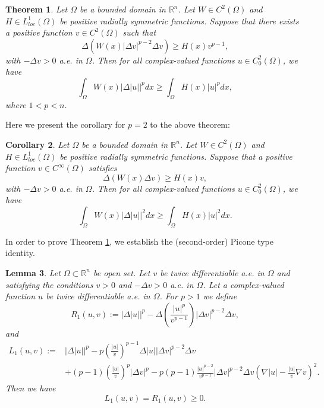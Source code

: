\documentclass[a4paper,12pt,reqno]{amsart}
\theoremstyle{theorem}
\numberwithin{equation}{section}
\theoremstyle{plain}
\newtheorem{thm}{Theorem}[section]
\newtheorem{cor}[thm]{Corollary}
\newtheorem{lem}[thm]{Lemma}
\theoremstyle{definition}
\theoremstyle{defi}
\begin{document}
\begin{thm}\label{thm_Rellich}
	Let $\Omega$ be a bounded domain in $\mathbb{R}^n$. Let $W \in C^{2}(\Omega)$ and $H \in L^1_{loc}(\Omega)$ be positive radially symmetric functions. Suppose that there exists a positive function $v\in C^{2}(\Omega)$ such that
	\begin{equation}\label{R-hyp_lp}
	\Delta (W(x) |\Delta v|^{p-2}\Delta v) \geq H(x) v^{p-1},
	\end{equation}
	with $-\Delta v >0$ a.e. in $\Omega$. Then for all complex-valued functions $ u \in C^{2}_0(\Omega)$, we have 
	\begin{equation}
	\int_{\Omega} W(x) |\Delta |u||^p dx \geq \int_{\Omega} H(x) |u|^p dx,
	\end{equation}
	where $1<p<n$.
\end{thm}
Here we present the corollary for $p=2$ to the above theorem:
\begin{cor}\label{cor_Rellich}
	Let $\Omega$ be a bounded domain in $\mathbb{R}^n$. Let $W \in C^{2}(\Omega)$ and $H \in L^1_{loc}(\Omega)$ be positive radially symmetric functions. Suppose that a positive function $v\in C^{\infty}(\Omega)$ satisfies
	\begin{equation}\label{R-hyp_l2}
	\Delta (W(x)\Delta v) \geq H(x) v,
	\end{equation}
	with $-\Delta v >0$ a.e. in $\Omega$. Then for all complex-valued functions $ u \in C^{2}_0(\Omega)$, we have 
	\begin{equation}\label{R_eq_l2}
	\int_{\Omega} W(x) |\Delta |u||^2 dx \geq \int_{\Omega} H(x) |u|^2 dx.
	\end{equation}
\end{cor}
In order to prove Theorem \ref{thm_Rellich}, we establish the (second-order) Picone type identity. 
\begin{lem}\label{lem_Piceone-R}
	Let $\Omega \subset \mathbb{R}^n$ be open set. Let $v$ be twice differentiable a.e. in $\Omega$ and satisfying the conditions $v >0$ and $-\Delta v >0$ a.e. in $\Omega$. Let a complex-valued function $u$ be twice differentiable a.e. in $\Omega$. For $p>1$ we define
	\begin{equation}
	R_1(u,v):= |\Delta |u||^p - \Delta\left( \frac{|u|^p}{v^{p-1}} \right) |\Delta v|^{p-2} \Delta v, 
	\end{equation}
	and 
	\begin{align}
	L_1(u,v):= &|\Delta |u||^p - p \left(\frac{|u|}{v}\right)^{p-1} \Delta |u| |\Delta v|^{p-2} \Delta v \\
	& + (p-1)\left( \frac{|u|}{v}\right)^p |\Delta v|^p  - p(p-1)\frac{|u|^{p-2}}{v^{p-1}} |\Delta v|^{p-2} \Delta v \left( \nabla |u| - \frac{|u|}{v} \nabla v\right)^2. \nonumber
	\end{align}
	Then we have 
	\begin{equation}
	L_1(u,v)=R_1(u,v) \geq 0.
	\end{equation}
\end{lem}
\end{document}
